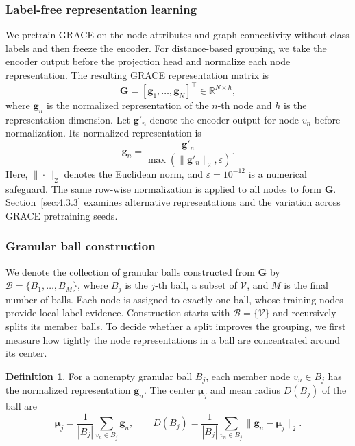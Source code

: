 \documentclass[a4paper,fleqn]{cas-sc}
\theoremstyle{definition}
\newtheorem{definition}{Definition}
\theoremstyle{plain}
\begin{document}
\subsubsection{Label-free representation learning}\label{sec:3.2.1}

\enlargethispage{\baselineskip}
We pretrain GRACE \cite{ref12} on the node attributes and graph connectivity without class labels and then freeze the encoder. For distance-based grouping, we take the encoder output before the projection head and normalize each node representation. The resulting GRACE representation matrix is
\begin{equation}\label{eq:2}
\mathbf G=[\mathbf g_1,\ldots,\mathbf g_N]^\top\in\mathbb R^{N\times h},
\end{equation}
where \(\mathbf g_n\) is the normalized representation of the \(n\)-th node and \(h\) is the representation dimension. Let \(\mathbf g'_n\) denote the encoder output for node \(v_n\) before normalization. Its normalized representation is
\begin{equation}\label{eq:3}
\mathbf g_n=\frac{\mathbf g'_n}{\max(\|\mathbf g'_n\|_2,\varepsilon)}.
\end{equation}
Here, \(\|\cdot\|_2\) denotes the Euclidean norm, and \(\varepsilon=10^{-12}\) is a numerical safeguard. The same row-wise normalization is applied to all nodes to form \(\mathbf G\). \hyperref[sec:4.3.3]{Section~\ref*{sec:4.3.3}} examines alternative representations and the variation across GRACE pretraining seeds.

\subsubsection{Granular ball construction}\label{sec:3.2.2}

We denote the collection of granular balls constructed from \(\mathbf G\) by \(\mathcal B=\{B_1,\ldots,B_M\}\), where \(B_j\) is the \(j\)-th ball, a subset of \(\mathcal V\), and \(M\) is the final number of balls. Each node is assigned to exactly one ball, whose training nodes provide local label evidence. Construction starts with \(\mathcal B=\{\mathcal V\}\) and recursively splits its member balls. To decide whether a split improves the grouping, we first measure how tightly the node representations in a ball are concentrated around its center.

\begin{definition}
For a nonempty granular ball \(B_j\), each member node \(v_n\in B_j\) has the normalized representation \(\mathbf g_n\). The center \(\boldsymbol\mu_j\) and mean radius \(D(B_j)\) of the ball are
\begin{equation}\label{eq:4}
\boldsymbol\mu_j=\frac{1}{|B_j|}\sum_{v_n\in B_j}\mathbf g_n,
\qquad D(B_j)=\frac{1}{|B_j|}\sum_{v_n\in B_j}\|\mathbf g_n-\boldsymbol\mu_j\|_2.
\end{equation}
\end{definition}
\end{document}
